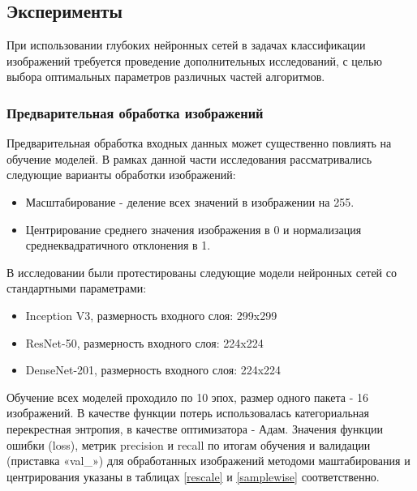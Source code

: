 
% 

\clearpage

\subsection{Эксперименты}
При использовании глубоких нейронных сетей в задачах классификации изображений требуется проведение дополнительных исследований, с целью выбора оптимальных параметров различных частей алгоритмов. 

\subsubsection{Предварительная обработка изображений}
Предварительная обработка входных данных может существенно повлиять на обучение моделей. В рамках данной части исследования рассматривались следующие варианты обработки изображений:
\begin{itemize}    
    \item Масштабирование - деление всех значений в изображении на 255.
    \item Центрирование среднего значения изображения в 0 и нормализация среднеквадратичного отклонения в 1.
\end{itemize}
В исследовании были протестированы следующие модели нейронных сетей со стандартными параметрами:
\begin{itemize}
    \item Inception V3, размерность входного слоя: 299x299
    \item ResNet-50, размерность входного слоя: 224x224
    \item DenseNet-201, размерность входного слоя:  224x224
\end{itemize} 
Обучение всех моделей проходило по 10 эпох, размер одного пакета - 16 изображений. В качестве функции потерь использовалась категориальная перекрестная энтропия, в качестве оптимизатора - Адам. 
Значения функции ошибки (loss), метрик precision и recall  по итогам обучения и валидации (приставка «val\_») для обработанных изображений методоми маштабирования и центрирования указаны в таблицах \ref{rescale} и \ref{samplewise} соответственно. 

